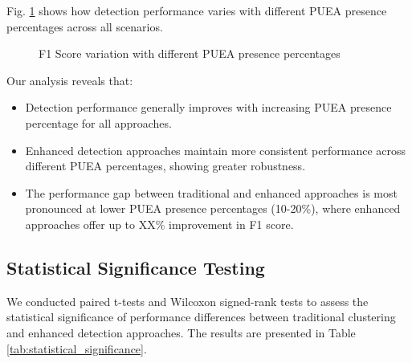 \documentclass[conference]{IEEEtran}
\begin{document}
Fig. \ref{fig:puea_percentage_impact} shows how detection performance varies with different PUEA presence percentages across all scenarios.

\begin{figure}[!t]
\centering
{}
\caption{F1 Score variation with different PUEA presence percentages}
\label{fig:puea_percentage_impact}
\end{figure}

Our analysis reveals that:

\begin{itemize}
    \item Detection performance generally improves with increasing PUEA presence percentage for all approaches.
    \item Enhanced detection approaches maintain more consistent performance across different PUEA percentages, showing greater robustness.
    \item The performance gap between traditional and enhanced approaches is most pronounced at lower PUEA presence percentages (10-20\%), where enhanced approaches offer up to XX\% improvement in F1 score.
\end{itemize}

\subsection{Statistical Significance Testing}

We conducted paired t-tests and Wilcoxon signed-rank tests to assess the statistical significance of performance differences between traditional clustering and enhanced detection approaches. The results are presented in Table \ref{tab:statistical_significance}.
\end{document}
